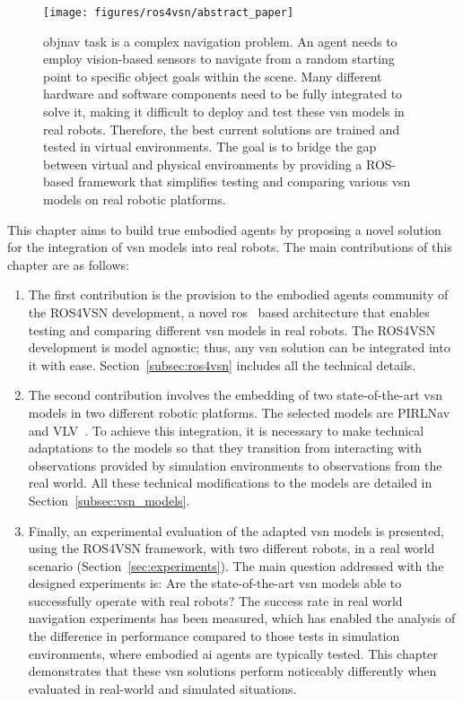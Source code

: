 \begin{figure}
    \centering
        \texttt{[image: figures/ros4vsn/abstract\_paper]}
        \caption{
        \acrshort{objnav} task is a complex navigation problem.
        An agent needs to employ vision-based sensors to navigate from a random starting point to specific object goals within the scene.
        Many different hardware and software components need to be fully integrated to solve it, making it difficult to deploy and test these \acrshort{vsn} models in real robots.
        Therefore, the best current solutions are trained and tested in virtual environments.
        The goal is to bridge the gap between virtual and physical environments by providing a ROS-based framework that simplifies testing and comparing various \acrshort{vsn} models on real robotic platforms.
        }
        \label{fig:abstract_ros4vsn}
\end{figure}

This chapter aims to build true embodied agents by proposing a novel solution for the integration of \acrshort{vsn} models into real robots.
The main contributions of this chapter are as follows:
\begin{enumerate}
 \item The first contribution is the provision to the embodied agents community of the ROS4VSN development, a novel \acrfull{ros}~\cite{ros} based architecture that enables testing and comparing different \acrshort{vsn} models in real robots.
 The ROS4VSN development is model agnostic; thus, any \acrshort{vsn} solution can be integrated into it with ease.
 Section~\ref{subsec:ros4vsn} includes all the technical details.
 \item The second contribution involves the embedding of two state-of-the-art \acrshort{vsn} models in two different robotic platforms.
 The selected models are PIRLNav~\cite{ramrakhya2023} and VLV~\cite{chang2020}.
 To achieve this integration, it is necessary to make technical adaptations to the models so that they transition from interacting with observations provided by simulation environments to observations from the real world.
 All these technical modifications to the models are detailed in Section~\ref{subsec:vsn_models}.
 \item Finally, an experimental evaluation of the adapted \acrshort{vsn} models is presented, using the ROS4VSN framework, with two different robots, in a real world scenario (Section~\ref{sec:experiments}).
 The main question addressed with the designed experiments is: Are the state-of-the-art \acrshort{vsn} models able to successfully operate with real robots?
 The success rate in real world navigation experiments has been measured, which has enabled the analysis of the difference in performance compared to those tests in simulation environments, where embodied \acrshort{ai} agents are typically tested.
 This chapter demonstrates that these \acrshort{vsn} solutions perform noticeably differently when evaluated in real-world and simulated situations.
\end{enumerate}

